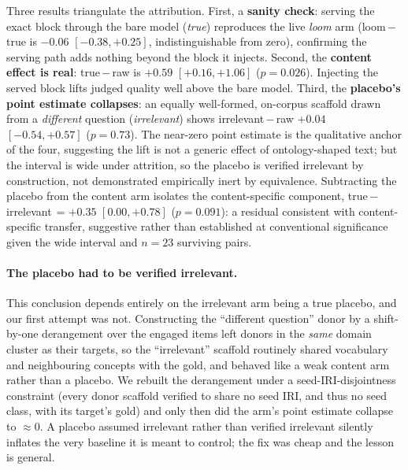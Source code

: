 \documentclass[10pt,twocolumn]{article}
\begin{document}
Three results triangulate the attribution. First, a \textbf{sanity check}: serving the exact block
through the bare model (\emph{true}) reproduces the live \emph{loom} arm (loom\,$-$\,true is
$-0.06$ $[-0.38,+0.25]$, indistinguishable from zero), confirming the serving path adds nothing beyond
the block it injects. Second, the \textbf{content effect is real}: true\,$-$\,raw is $+0.59$
$[+0.16,+1.06]$ ($p=0.026$). Injecting the served block lifts judged quality well above the bare
model. Third, the \textbf{placebo's point estimate collapses}: an equally well-formed, on-corpus
scaffold drawn from a \emph{different} question (\emph{irrelevant}) shows irrelevant\,$-$\,raw
$+0.04$ $[-0.54,+0.57]$ ($p=0.73$). The near-zero point estimate is the qualitative anchor of the
four, suggesting the lift is not a generic effect of ontology-shaped text; but the interval is wide
under attrition, so the placebo is verified irrelevant by construction, not demonstrated empirically
inert by equivalence. Subtracting
the placebo from the content arm isolates the content-specific component,
true\,$-$\,irrelevant\,$=+0.35$ $[0.00,+0.78]$ ($p=0.091$): a residual consistent with content-specific
transfer, suggestive rather than established at conventional significance given the wide interval and
$n=23$ surviving pairs.

\paragraph{The placebo had to be verified irrelevant.} This conclusion depends entirely on the irrelevant
arm being a true placebo, and our first attempt was not. Constructing the ``different question'' donor
by a shift-by-one derangement over the engaged items left donors in the \emph{same} domain cluster as
their targets, so the ``irrelevant'' scaffold routinely shared vocabulary and neighbouring concepts
with the gold, and behaved like a weak content arm rather than a placebo. We rebuilt the derangement
under a seed-IRI-disjointness constraint (every donor scaffold verified to share no seed IRI, and thus
no seed class, with its target's gold) and only then did the arm's point estimate collapse to
$\approx0$. A placebo assumed irrelevant rather than verified irrelevant silently inflates the very
baseline it is meant to control; the fix was cheap and the lesson is general.
\end{document}
